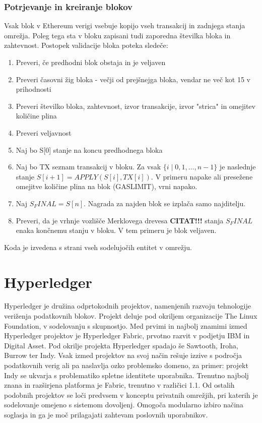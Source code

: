 \documentclass[a4paper, 12pt]{book}
\begin{document}
\subsubsection{Potrjevanje in kreiranje blokov}
Vsak blok v Ethereum verigi vsebuje kopijo vseh transakcij in zadnjega stanja omrežja.
Poleg tega sta v bloku zapisani tudi zaporedna številka bloka in zahtevnost.
Postopek validacije bloka poteka sledeče:
\begin{enumerate}
\item Preveri, če predhodni blok obstaja in je veljaven
\item Preveri časovni žig bloka - večji od prejšnejga bloka, vendar ne več kot 15 v prihodnosti
\item Preveri številko bloka, zahtevnost, izvor transakcije, izvor "strica" in omejitev količine plina
\item Preveri veljavnost 
\item Naj bo S[0] stanje na koncu predhodnega bloka
\item Naj bo TX seznam transakcij v bloku. Za vsak 
$\{i \mid 0,1,\dots, n-1\}$
je naslednje stanje
 $S[i+1] = APPLY(S[i], TX[i])$.
V primeru napake ali presežene omejitve količine plina na blok (GASLIMIT), vrni napako.
\item Naj $S_FINAL = S[n]$. Nagrada za najden blok se izplača samo najditelju.
\item Preveri, da je vrhnje vozlišče Merklovega drevesa \textbf{CITAT!!!} stanja $S_FINAL$ enaka končnemu stanju v bloku. V tem primeru je blok veljaven.
\end{enumerate}

Koda je izvedena s strani vseh sodelujočih entitet v omrežju. \cite{ethereumWhitepaper}

\section{Hyperledger}
Hyperledger je družina odprtokodnih projektov, namenjenih razvoju tehnologije veriženja podatkovnih blokov.
Projekt deluje pod okriljem organizacije The Linux Foundation, v sodelovanju s skupnostjo.
Med prvimi in najbolj znamimi izmed Hyperledger projektov je Hyperledger Fabric, prvotno razvit v podjetju IBM in Digital Asset.
Pod okrilje projekta Hyperledger spadajo še Sawtooth, Iroha, Burrow ter Indy.
Vsak izmed projektov na svoj način rešuje izzive s področja podatkovnih verig ali pa naslavlja ozko problemsko domeno, za primer: projekt Indy se ukvarja s problematiko spletne identitete uporabnika. \cite{hyperledgerWeb}
Trenutno najbolj znana in razširjena platforma je Fabric, trenutno v različici 1.1.
Od ostalih podobnih projektov se loči predvsem v konceptu privatnih omrežjih, pri katerih je sodelovanje omejeno s sistemom dovoljenj.
Omogoča modularno izbiro načina soglasja in ga je moč prilagajati zahtevam poslovnih uporabnikov. \cite{hyperledgerIbm}
\end{document}
